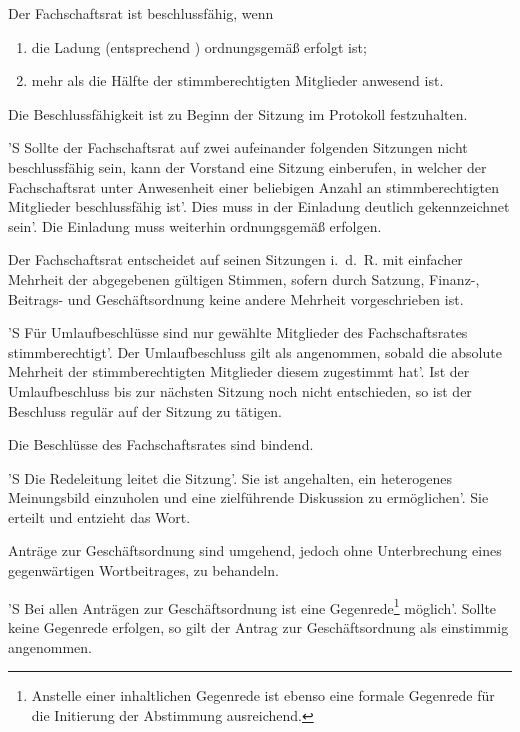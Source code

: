 \documentclass[%
	parskip=half,
]{scrartcl}
\newcommand{\edit}[1]{{\color{red} #1}}
\newcommand{\add}[1]{{\color{blue} #1}}
\begin{document}
\begin{contract}

Der Fachschaftsrat ist beschlussfähig, wenn
\begin{enumerate}[\qquad a)]
	\item die Ladung \add{(entsprechend )} ordnungsgemäß erfolgt ist;
	\item mehr als die Hälfte der stimmberechtigten Mitglieder anwesend ist.
\end{enumerate}

Die Beschlussfähigkeit ist zu Beginn der Sitzung \add{im Protokoll} festzuhalten.

'S Sollte der Fachschaftsrat auf zwei aufeinander folgenden Sitzungen nicht beschlussfähig sein, \edit{kann der 
Vorstand} eine Sitzung einberufen, in welcher der Fachschaftsrat unter Anwesenheit einer beliebigen Anzahl an 
stimmberechtigten Mitglieder beschlussfähig ist'. Dies muss in der Einladung deutlich gekennzeichnet sein'. Die 
Einladung muss weiterhin ordnungsgemäß erfolgen.

Der Fachschaftsrat entscheidet auf seinen Sitzungen i.~d.~R. mit einfacher Mehrheit der abgegebenen gültigen Stimmen, 
sofern durch Satzung, Finanz-, Beitrags- und Geschäftsordnung keine andere Mehrheit vorgeschrieben ist.

'S Für Umlaufbeschlüsse sind nur gewählte Mitglieder des Fachschaftsrates stimmberechtigt'. Der Umlaufbeschluss gilt 
als angenommen, sobald die absolute Mehrheit \add{der stimmberechtigten Mitglieder} diesem zugestimmt hat'. Ist der 
Umlaufbeschluss bis zur nächsten Sitzung noch nicht entschieden, so ist der Beschluss regulär auf der Sitzung zu 
tätigen.

Die Beschlüsse des Fachschaftsrates sind bindend.

\Clause{title={\edit{Redeleitung}}}

'S Die \edit{Redeleitung} leitet die Sitzung'. Sie ist angehalten, ein heterogenes Meinungsbild einzuholen und eine 
zielführende Diskussion zu ermöglichen'. Sie erteilt und entzieht das Wort.


Anträge zur Geschäftsordnung sind umgehend, jedoch ohne \edit{Unterbrechung eines gegenwärtigen Wortbeitrages}, zu 
behandeln.

'S Bei allen Anträgen zur Geschäftsordnung ist eine Gegenrede\footnote{\add{Anstelle einer inhaltlichen Gegenrede 
ist ebenso eine formale Gegenrede für die Initierung der Abstimmung ausreichend.}} möglich'. Sollte keine Gegenrede 
erfolgen, so gilt der Antrag zur Geschäftsordnung als einstimmig angenommen.


\end{contract}
\end{document}
